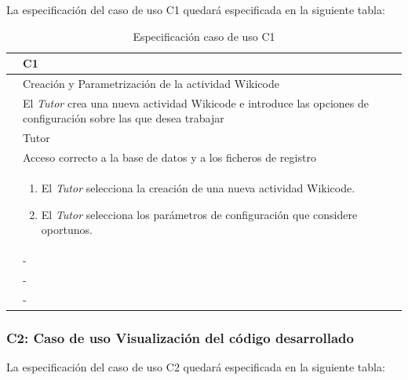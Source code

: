 La especificación del caso de uso C1 quedará especificada en la siguiente tabla:

\begin{table}[h]
\centering
\begin{tabular}{ | p{} | p{} | }
	\hline
	\cellcolor[gray]{.8}{ID} & C1 \\
	\hline 
	\cellcolor[gray]{.8}{Nombre} & Creación y Parametrización de la actividad Wikicode \\
	\hline
	\cellcolor[gray]{.8}{Descripción} & El \emph{Tutor} crea una nueva actividad Wikicode e introduce las opciones de configuración sobre las que desea trabajar \\
	\hline
	\cellcolor[gray]{.8}{Actores} & Tutor \\
	\hline
	\cellcolor[gray]{.8}{Asunciones} & Acceso correcto a la base de datos y a los ficheros de registro \\
	\hline
	\cellcolor[gray]{.8}{Pasos} & \begin{enumerate}
		\item El \emph{Tutor} selecciona la creación de una nueva actividad Wikicode.
		\item El \emph{Tutor} selecciona los parámetros de configuración que considere oportunos.
		\end{enumerate} \\
	\hline
	\cellcolor[gray]{.8}{Variaciones} & - \\
	\hline
	\cellcolor[gray]{.8}{Requisitos no funcionales} & - \\
	\hline
	\cellcolor[gray]{.8}{Cuestiones} & - \\
	\hline
	
\end{tabular}
\caption{Especificación caso de uso C1}
\end{table}

\newpage
\subsubsection{C2: Caso de uso Visualización del código desarrollado}

La especificación del caso de uso C2 quedará especificada en la siguiente tabla:

